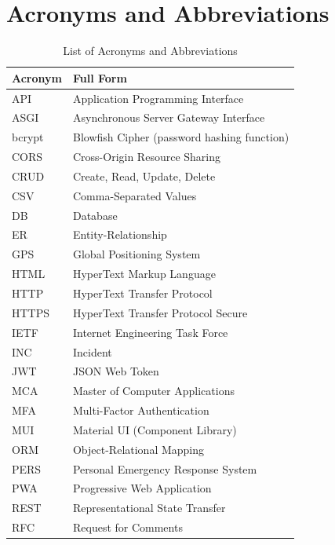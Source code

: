 \appendix

\chapter{Acronyms and Abbreviations}

\begin{table}[H]
  \centering
  \caption{List of Acronyms and Abbreviations}
  \label{tab:acronyms}
  \begin{tabularx}{\textwidth}{@{}l X@{}}
    \toprule
    \textbf{Acronym} & \textbf{Full Form} \\
    \midrule
    API & Application Programming Interface \\
    ASGI & Asynchronous Server Gateway Interface \\
    bcrypt & Blowfish Cipher (password hashing function) \\
    CORS & Cross-Origin Resource Sharing \\
    CRUD & Create, Read, Update, Delete \\
    CSV & Comma-Separated Values \\
    DB & Database \\
    ER & Entity-Relationship \\
    GPS & Global Positioning System \\
    HTML & HyperText Markup Language \\
    HTTP & HyperText Transfer Protocol \\
    HTTPS & HyperText Transfer Protocol Secure \\
    IETF & Internet Engineering Task Force \\
    INC & Incident \\
    JWT & JSON Web Token \\
    MCA & Master of Computer Applications \\
    MFA & Multi-Factor Authentication \\
    MUI & Material UI (Component Library) \\
    ORM & Object-Relational Mapping \\
    PERS & Personal Emergency Response System \\
    PWA & Progressive Web Application \\
    REST & Representational State Transfer \\
    RFC & Request for Comments \\

\end{tabularx}
\end{table}
